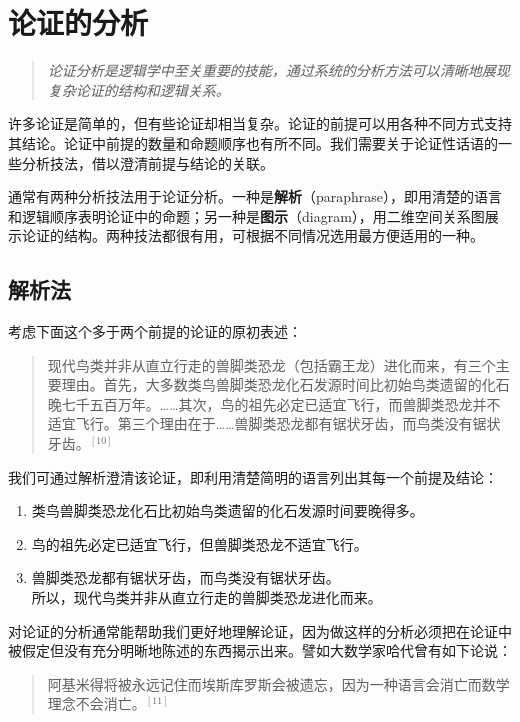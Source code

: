 \section{论证的分析}

\begin{quotation}
\textit{论证分析是逻辑学中至关重要的技能，通过系统的分析方法可以清晰地展现复杂论证的结构和逻辑关系。}
\end{quotation}

许多论证是简单的，但有些论证却相当复杂。论证的前提可以用各种不同方式支持其结论。论证中前提的数量和命题顺序也有所不同。我们需要关于论证性话语的一些分析技法，借以澄清前提与结论的关联。

通常有两种分析技法用于论证分析。一种是\textbf{解析}（paraphrase），即用清楚的语言和逻辑顺序表明论证中的命题；另一种是\textbf{图示}（diagram），用二维空间关系图展示论证的结构。两种技法都很有用，可根据不同情况选用最方便适用的一种。

\subsection{解析法}

考虑下面这个多于两个前提的论证的原初表述：

\begin{quotation}
现代鸟类并非从直立行走的兽脚类恐龙（包括霸王龙）进化而来，有三个主要理由。首先，大多数类鸟兽脚类恐龙化石发源时间比初始鸟类遗留的化石晚七千五百万年。……其次，鸟的祖先必定已适宜飞行，而兽脚类恐龙并不适宜飞行。第三个理由在于……兽脚类恐龙都有锯状牙齿，而鸟类没有锯状牙齿。${}^{[10]}$
\end{quotation}

我们可通过解析澄清该论证，即利用清楚简明的语言列出其每一个前提及结论：

\begin{enumerate}
  \item 类鸟兽脚类恐龙化石比初始鸟类遗留的化石发源时间要晚得多。
  \item 鸟的祖先必定已适宜飞行，但兽脚类恐龙不适宜飞行。
  \item 兽脚类恐龙都有锯状牙齿，而鸟类没有锯状牙齿。\\
  所以，现代鸟类并非从直立行走的兽脚类恐龙进化而来。
\end{enumerate}

对论证的分析通常能帮助我们更好地理解论证，因为做这样的分析必须把在论证中被假定但没有充分明晰地陈述的东西揭示出来。譬如大数学家哈代曾有如下论说：

\begin{quotation}
阿基米得将被永远记住而埃斯库罗斯会被遗忘，因为一种语言会消亡而数学理念不会消亡。${}^{[11]}$
\end{quotation}


